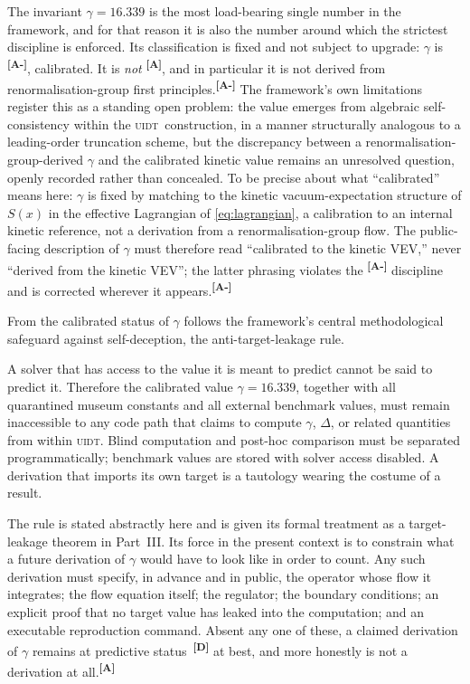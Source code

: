 \documentclass[12pt,a4paper,twoside]{article}
\theoremstyle{plain}
\theoremstyle{definition}
\theoremstyle{remark}
\newcommand{\UIDT}{\textsc{uidt}}
\newcommand{\catmark}[1]{\textsuperscript{\textsf{\textbf{[#1]}}}}
\newcommand{\Sx}{S(x)}
\newcommand{\GammaGeom}{16.339} %
\begin{document}
The invariant $\gamma = \GammaGeom$ is the most load-bearing single number in the framework, and for that reason it is also the number around which the strictest discipline is enforced. Its classification is fixed and not subject to upgrade: $\gamma$ is \catmark{A-}, calibrated. It is \emph{not} \catmark{A}, and in particular it is not derived from renormalisation-group first principles.\catmark{A-} The framework's own limitations register this as a standing open problem: the value emerges from algebraic self-consistency within the \UIDT\ construction, in a manner structurally analogous to a leading-order truncation scheme, but the discrepancy between a renormalisation-group-derived $\gamma$ and the calibrated kinetic value remains an unresolved question, openly recorded rather than concealed. To be precise about what ``calibrated'' means here: $\gamma$ is fixed by matching to the kinetic vacuum-expectation structure of $\Sx$ in the effective Lagrangian of \cref{eq:lagrangian}, a calibration to an internal kinetic reference, not a derivation from a renormalisation-group flow. The public-facing description of $\gamma$ must therefore read ``calibrated to the kinetic VEV,'' never ``derived from the kinetic VEV''; the latter phrasing violates the \catmark{A-} discipline and is corrected wherever it appears.\catmark{A-}

From the calibrated status of $\gamma$ follows the framework's central methodological safeguard against self-deception, the anti-target-leakage rule.
\newpage
\begin{governancebox}
A solver that has access to the value it is meant to predict cannot be said to predict it. Therefore the calibrated value $\gamma = 16.339$, together with all quarantined museum constants and all external benchmark values, must remain inaccessible to any code path that claims to compute $\gamma$, $\Delta$, or related quantities from within \UIDT. Blind computation and post-hoc comparison must be separated programmatically; benchmark values are stored with solver access disabled. A derivation that imports its own target is a tautology wearing the costume of a result.
\end{governancebox}

\noindent The rule is stated abstractly here and is given its formal treatment as a target-leakage theorem in Part~III. Its force in the present context is to constrain what a future derivation of $\gamma$ would have to look like in order to count. Any such derivation must specify, in advance and in public, the operator whose flow it integrates; the flow equation itself; the regulator; the boundary conditions; an explicit proof that no target value has leaked into the computation; and an executable reproduction command. Absent any one of these, a claimed derivation of $\gamma$ remains at predictive status~\catmark{D} at best, and more honestly is not a derivation at all.\catmark{A}
\end{document}
